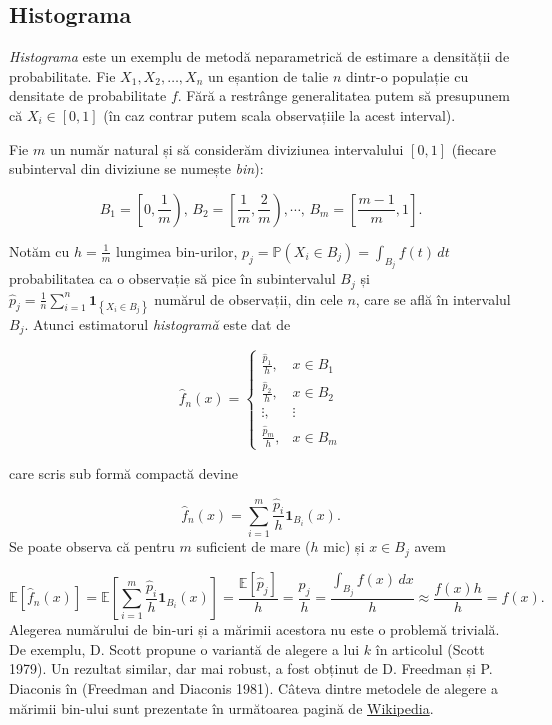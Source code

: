 \documentclass[]{article}
\begin{document}
\subsection{Histograma}\label{histograma}

\emph{Histograma} este un exemplu de metodă neparametrică de estimare a
densității de probabilitate. Fie \(X_1, X_2, \ldots, X_n\) un eșantion
de talie \(n\) dintr-o populație cu densitate de probabilitate \(f\).
Fără a restrânge generalitatea putem să presupunem că \(X_i\in[0,1]\)
(în caz contrar putem scala observațiile la acest interval).

Fie \(m\) un număr natural și să considerăm diviziunea intervalului
\([0,1]\) (fiecare subinterval din diviziune se numește \emph{bin}):

\[
  B_1 = \left[0, \frac{1}{m}\right), \, B_2 = \left[\frac{1}{m}, \frac{2}{m}\right),\cdots,\, B_m = \left[\frac{m-1}{m}, 1\right].
\]

Notăm cu \(h = \frac{1}{m}\) lungimea bin-urilor,
\(p_j = \mathbb{P}(X_i\in B_j) = \int_{B_j}f(t)\,dt\) probabilitatea ca
o observație să pice în subintervalul \(B_j\) și
\(\hat{p}_j = \frac{1}{n}\sum_{i = 1}^{n}\mathbf{1}_{\left\{X_i \in B_j\right\}}\)
numărul de observații, din cele \(n\), care se află în intervalul
\(B_j\). Atunci estimatorul \emph{histogramă} este dat de

\[
  \hat{f}_n(x) = \left\{\begin{array}{llll}
            \frac{\hat{p}_1}{h}, & x\in B_1\\
            \frac{\hat{p}_2}{h}, & x\in B_2\\
            \vdots, & \vdots\\
            \frac{\hat{p}_m}{h}, & x\in B_m
  \end{array}\right.
\]

care scris sub formă compactă devine

\[
  \hat{f}_n(x) = \sum_{i=1}^{m} \frac{\hat{p}_i}{h} \mathbf{1}_{B_i}(x).
\] Se poate observa că pentru \(m\) suficient de mare (\(h\) mic) și
\(x\in B_j\) avem

\[
  \mathbb{E}\left[\hat{f}_n(x)\right] = \mathbb{E}\left[\sum_{i=1}^{m} \frac{\hat{p}_i}{h} \mathbf{1}_{B_i}(x)\right]= \frac{\mathbb{E}\left[\hat{p}_j\right]}{h} = \frac{p_j}{h} = \frac{\int_{B_j}f(x)\,dx}{h}\approx \frac{f(x)h}{h} = f(x).
\] Alegerea numărului de bin-uri și a mărimii acestora nu este o
problemă trivială. De exemplu, D. Scott propune o variantă de alegere a
lui \(k\) în articolul (Scott 1979). Un rezultat similar, dar mai
robust, a fost obținut de D. Freedman și P. Diaconis în (Freedman and
Diaconis 1981). Câteva dintre metodele de alegere a mărimii bin-ului
sunt prezentate în următoarea pagină de
\href{https://en.wikipedia.org/wiki/Histogram\#Number_of_bins_and_width}{Wikipedia}.
\end{document}

